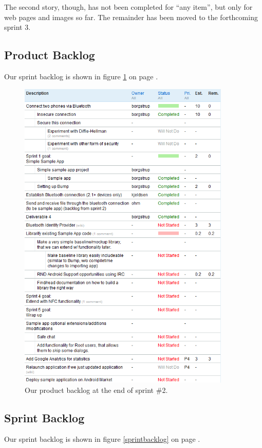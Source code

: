\documentclass[a4paper,11pt]{article}
\begin{document}
The second story, though, has not been completed for ``any item'', but only for web pages and images so far. The remainder has been moved to the forthcoming sprint 3.

\subsection{Product Backlog}
Our sprint backlog is shown in figure \ref{productbacklog} on page \pageref{productbacklog}.

\begin{figure}[ht!]
	\begin{center}
	\includegraphics[width=0.9\textwidth]{productbacklog.png}		
	\end{center}
	\caption{Our product backlog at the end of sprint \#2.}
	\label{productbacklog}
\end{figure}

\subsection{Sprint Backlog}
Our sprint backlog is shown in figure \ref{sprintbacklog} on page \pageref{sprintbacklog}.
\end{document}
